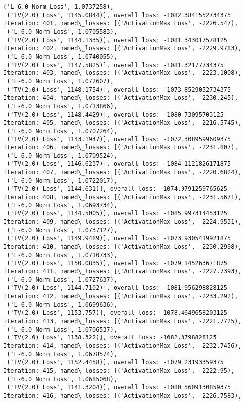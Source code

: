 \documentclass[10pt]{article}
\begin{document}
\begin{Verbatim}[commandchars=\\\{\}]
 ('L-6.0 Norm Loss', 1.0737258),
 ('TV(2.0) Loss', 1145.0844)], overall loss: -1082.3841552734375
Iteration: 401, named\_losses: [('ActivationMax Loss', -2226.547),
 ('L-6.0 Norm Loss', 1.0705583),
 ('TV(2.0) Loss', 1144.1335)], overall loss: -1081.343017578125
Iteration: 402, named\_losses: [('ActivationMax Loss', -2229.9783),
 ('L-6.0 Norm Loss', 1.0740055),
 ('TV(2.0) Loss', 1147.5825)], overall loss: -1081.32177734375
Iteration: 403, named\_losses: [('ActivationMax Loss', -2223.1008),
 ('L-6.0 Norm Loss', 1.072607),
 ('TV(2.0) Loss', 1148.1754)], overall loss: -1073.8529052734375
Iteration: 404, named\_losses: [('ActivationMax Loss', -2230.245),
 ('L-6.0 Norm Loss', 1.0713866),
 ('TV(2.0) Loss', 1148.4429)], overall loss: -1080.73095703125
Iteration: 405, named\_losses: [('ActivationMax Loss', -2216.5745),
 ('L-6.0 Norm Loss', 1.0707264),
 ('TV(2.0) Loss', 1143.1947)], overall loss: -1072.3089599609375
Iteration: 406, named\_losses: [('ActivationMax Loss', -2231.807),
 ('L-6.0 Norm Loss', 1.0709524),
 ('TV(2.0) Loss', 1146.6237)], overall loss: -1084.1121826171875
Iteration: 407, named\_losses: [('ActivationMax Loss', -2220.6824),
 ('L-6.0 Norm Loss', 1.0722017),
 ('TV(2.0) Loss', 1144.631)], overall loss: -1074.9791259765625
Iteration: 408, named\_losses: [('ActivationMax Loss', -2231.5671),
 ('L-6.0 Norm Loss', 1.0693734),
 ('TV(2.0) Loss', 1144.5005)], overall loss: -1085.997314453125
Iteration: 409, named\_losses: [('ActivationMax Loss', -2224.9531),
 ('L-6.0 Norm Loss', 1.0737127),
 ('TV(2.0) Loss', 1149.9489)], overall loss: -1073.9305419921875
Iteration: 410, named\_losses: [('ActivationMax Loss', -2230.2998),
 ('L-6.0 Norm Loss', 1.0710733),
 ('TV(2.0) Loss', 1150.0835)], overall loss: -1079.145263671875
Iteration: 411, named\_losses: [('ActivationMax Loss', -2227.7393),
 ('L-6.0 Norm Loss', 1.0727637),
 ('TV(2.0) Loss', 1144.7102)], overall loss: -1081.956298828125
Iteration: 412, named\_losses: [('ActivationMax Loss', -2233.292),
 ('L-6.0 Norm Loss', 1.0699636),
 ('TV(2.0) Loss', 1153.757)], overall loss: -1078.4649658203125
Iteration: 413, named\_losses: [('ActivationMax Loss', -2221.7725),
 ('L-6.0 Norm Loss', 1.0706537),
 ('TV(2.0) Loss', 1138.322)], overall loss: -1082.3798828125
Iteration: 414, named\_losses: [('ActivationMax Loss', -2232.7456),
 ('L-6.0 Norm Loss', 1.0678574),
 ('TV(2.0) Loss', 1152.4458)], overall loss: -1079.23193359375
Iteration: 415, named\_losses: [('ActivationMax Loss', -2222.95),
 ('L-6.0 Norm Loss', 1.0685068),
 ('TV(2.0) Loss', 1141.3204)], overall loss: -1080.5609130859375
Iteration: 416, named\_losses: [('ActivationMax Loss', -2226.7583),

\end{Verbatim}
\end{document}
